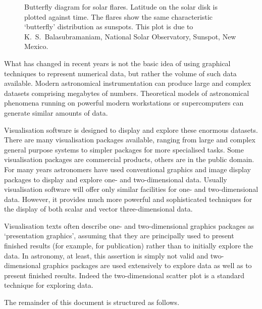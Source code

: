 \documentclass[twoside,11pt]{article}
\begin{document}

\begin{figure}[htbp]

\begin{center}
\leavevmode
\epsfxsize=449pt
\end{center}

\caption[Butterfly diagram for solar flares.]{Butterfly diagram for
solar flares. Latitude on the solar disk is plotted against time. The
flares show the same characteristic `butterfly' distribution as
sunspots. This plot is due to K.~S.~Balasubramaniam, National Solar
Observatory, Sunspot, New Mexico. \label{SUNSPOT} }

\end{figure}

What has changed in recent years is not the basic idea of using
graphical techniques to represent numerical data, but rather the volume
of such data available. Modern astronomical instrumentation can produce
large and complex datasets comprising megabytes of numbers. Theoretical
models of astronomical phenomena running on powerful modern workstations
or supercomputers can generate similar amounts of data.

Visualisation software is designed to display and explore these enormous
datasets. There are many visualisation packages available, ranging from
large and complex general purpose systems to simpler packages for more
specialised tasks. Some visualisation packages are commercial products,
others are in the public domain. For many years astronomers have used
conventional graphics and image display packages to display and explore
one- and two-dimensional data. Usually visualisation software will offer
only similar facilities for one- and two-dimensional data. However, it
provides much more powerful and sophisticated techniques for the
display of both scalar and vector three-dimensional data.

Visualisation texts often describe one- and two-dimensional graphics
packages as `presentation graphics', assuming that they are principally
used to present finished results (for example, for publication) rather
than to initially explore the data. In astronomy, at least, this
assertion is simply not valid and two-dimensional graphics packages are
used extensively to explore data as well as to present finished results.
Indeed the two-dimensional scatter plot is a standard technique for
exploring data.

The remainder of this document is structured as follows.
\end{document}
